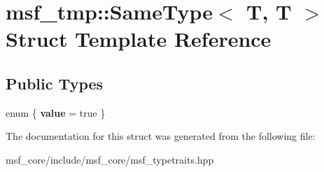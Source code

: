 \hypertarget{structmsf__tmp_1_1SameType_3_01T_00_01T_01_4}{\section{msf\-\_\-tmp\-:\-:Same\-Type$<$ T, T $>$ Struct Template Reference}
\label{structmsf__tmp_1_1SameType_3_01T_00_01T_01_4}
}
\subsection*{Public Types}
\begin{DoxyCompactItemize}
\item 
enum \{ {\bfseries value} =  true
 \}
\end{DoxyCompactItemize}


The documentation for this struct was generated from the following file\-:\begin{DoxyCompactItemize}
\item 
msf\-\_\-core/include/msf\-\_\-core/msf\-\_\-typetraits.\-hpp\end{DoxyCompactItemize}
